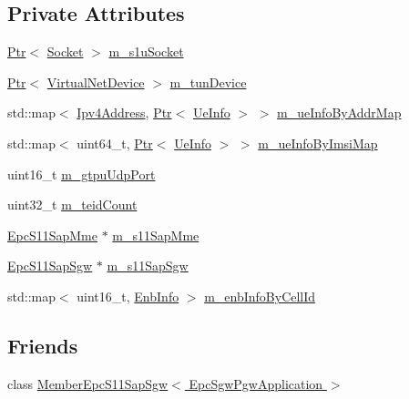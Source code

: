 \subsection*{Private Attributes}
\begin{DoxyCompactItemize}
\item 
\hyperlink{classns3_1_1Ptr}{Ptr}$<$ \hyperlink{classns3_1_1Socket}{Socket} $>$ \hyperlink{classns3_1_1EpcSgwPgwApplication_a2a36f49986d4851e3c184007c6480a90}{m\+\_\+s1u\+Socket}
\item 
\hyperlink{classns3_1_1Ptr}{Ptr}$<$ \hyperlink{classns3_1_1VirtualNetDevice}{Virtual\+Net\+Device} $>$ \hyperlink{classns3_1_1EpcSgwPgwApplication_abfd29706464464933ddc5a72469a97e1}{m\+\_\+tun\+Device}
\item 
std\+::map$<$ \hyperlink{classns3_1_1Ipv4Address}{Ipv4\+Address}, \hyperlink{classns3_1_1Ptr}{Ptr}$<$ \hyperlink{classns3_1_1EpcSgwPgwApplication_1_1UeInfo}{Ue\+Info} $>$ $>$ \hyperlink{classns3_1_1EpcSgwPgwApplication_ac5d167ff997bd9618e832a371f45cba0}{m\+\_\+ue\+Info\+By\+Addr\+Map}
\item 
std\+::map$<$ uint64\+\_\+t, \hyperlink{classns3_1_1Ptr}{Ptr}$<$ \hyperlink{classns3_1_1EpcSgwPgwApplication_1_1UeInfo}{Ue\+Info} $>$ $>$ \hyperlink{classns3_1_1EpcSgwPgwApplication_ac026923e4b06703faf659f0584573531}{m\+\_\+ue\+Info\+By\+Imsi\+Map}
\item 
uint16\+\_\+t \hyperlink{classns3_1_1EpcSgwPgwApplication_aaf54b6467029f7c3f038da709da10a09}{m\+\_\+gtpu\+Udp\+Port}
\item 
uint32\+\_\+t \hyperlink{classns3_1_1EpcSgwPgwApplication_a160d5f7d28ef531f5fc9bd9bdd5ac9ff}{m\+\_\+teid\+Count}
\item 
\hyperlink{classns3_1_1EpcS11SapMme}{Epc\+S11\+Sap\+Mme} $\ast$ \hyperlink{classns3_1_1EpcSgwPgwApplication_a37809771f2d925005b7deab8c5a2de3c}{m\+\_\+s11\+Sap\+Mme}
\item 
\hyperlink{classns3_1_1EpcS11SapSgw}{Epc\+S11\+Sap\+Sgw} $\ast$ \hyperlink{classns3_1_1EpcSgwPgwApplication_ac405e7e4e2e29f747b60a145a14d0b7c}{m\+\_\+s11\+Sap\+Sgw}
\item 
std\+::map$<$ uint16\+\_\+t, \hyperlink{structns3_1_1EpcSgwPgwApplication_1_1EnbInfo}{Enb\+Info} $>$ \hyperlink{classns3_1_1EpcSgwPgwApplication_afa8f803a667fc1c54fc855a8a3d8e550}{m\+\_\+enb\+Info\+By\+Cell\+Id}
\end{DoxyCompactItemize}
\subsection*{Friends}
\begin{DoxyCompactItemize}
\item 
class \hyperlink{classns3_1_1EpcSgwPgwApplication_a577f7e07cc928bffffc8fc7e445c0acc}{Member\+Epc\+S11\+Sap\+Sgw$<$ Epc\+Sgw\+Pgw\+Application $>$}
\end{DoxyCompactItemize}
